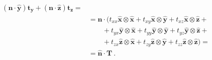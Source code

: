 \begin{example}
\begin{equation}
\begin{aligned}
      ( \bm{n} \cdot \bm{\hat{y}} ) \bm{t_y} + 
      ( \bm{n} \cdot \bm{\hat{z}} ) \bm{t_z} = \\
    & = \bm{n} \cdot ( t_{xx} \bm{\hat{x}} \otimes \bm{\hat{x}} + 
                       t_{xy} \bm{\hat{x}} \otimes \bm{\hat{y}} +
                       t_{xz} \bm{\hat{x}} \otimes \bm{\hat{z}} + \\
            & \qquad + t_{yx} \bm{\hat{y}} \otimes \bm{\hat{x}} + 
                       t_{yy} \bm{\hat{y}} \otimes \bm{\hat{y}} +
                       t_{yz} \bm{\hat{y}} \otimes \bm{\hat{z}} + \\
            & \qquad + t_{zx} \bm{\hat{z}} \otimes \bm{\hat{x}} + 
                       t_{zy} \bm{\hat{z}} \otimes \bm{\hat{y}} +
                       t_{zz} \bm{\hat{z}} \otimes \bm{\hat{z}} ) = \\
    & = \bm{\hat{n}} \cdot \bm{T}  \ .
\end{aligned}  
\end{equation}



\end{example}
